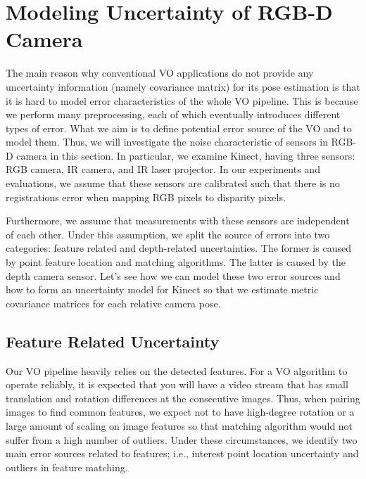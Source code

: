\documentclass[a4paper]{report}
\numberwithin{figure}{section}
\begin{document}
\section{Modeling Uncertainty of RGB-D Camera} \label{sc_modeling_uncertainty_of_rgbd}

The main reason why conventional VO applications do not provide any uncertainty
information (namely covariance matrix) for its pose estimation is that it is
hard to model error characteristics of the whole VO pipeline.  This is because
we perform many preprocessing, each of which eventually introduces different
types of error. What we aim is to define potential error source of the VO and
to model them. Thus, we will investigate the noise characteristic of sensors in
RGB-D camera in this section. In particular, we examine Kinect, having three
sensors: RGB camera, IR camera, and IR laser projector.  In our experiments and
evaluations, we assume that these sensors are calibrated such that there is no
registrations error when mapping RGB pixels to disparity pixels.

Furthermore, we assume that measurements with these sensors are independent of
each other.  Under this assumption, we split the source of errors into two
categories: feature related and depth-related uncertainties. The former is
caused by point feature location and matching algorithms. The latter is caused
by the depth camera sensor.  Let's see how we can model these two error sources
and how to form an uncertainty model for Kinect so that we estimate
metric covariance matrices for each relative camera pose.

\subsection{Feature Related Uncertainty} \label{sb_sc_pixel_uncertainty}

Our VO pipeline heavily relies on the detected features. For a VO algorithm to
operate reliably, it is expected that you will have a video stream that has
small translation and rotation differences at the consecutive images. Thus,
when pairing images to find common features, we expect not to have high-degree
rotation or a large amount of scaling on image features so that matching
algorithm would not suffer from a high number of outliers. Under these
circumstances, we identify two main error sources related to features; i.e.,
interest point location uncertainty and outliers in feature matching.
\end{document}
